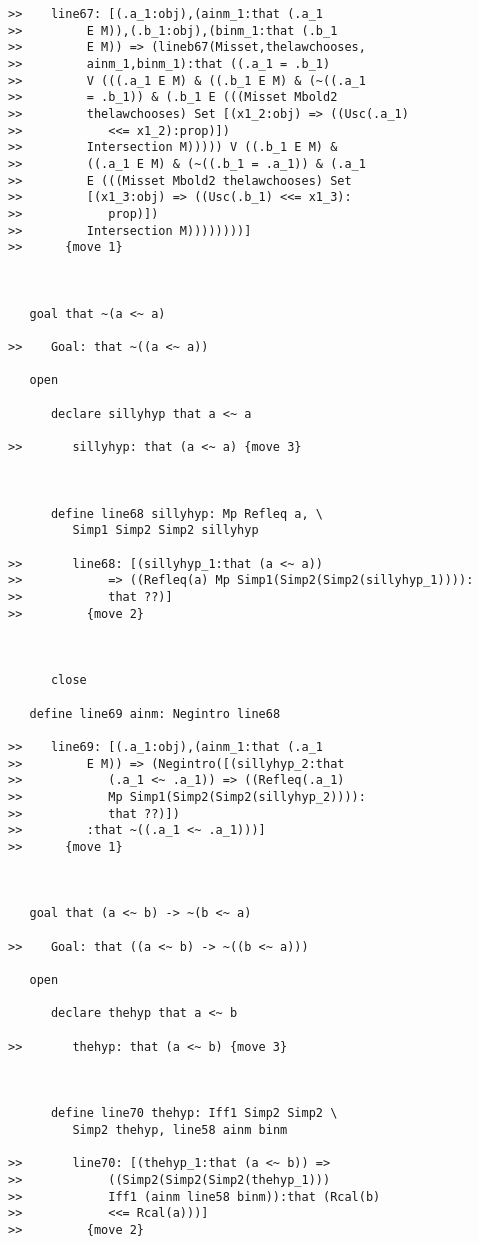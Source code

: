\documentclass[12pt]{article}
\begin{document}
\begin{verbatim}
>>    line67: [(.a_1:obj),(ainm_1:that (.a_1
>>         E M)),(.b_1:obj),(binm_1:that (.b_1
>>         E M)) => (lineb67(Misset,thelawchooses,
>>         ainm_1,binm_1):that ((.a_1 = .b_1)
>>         V (((.a_1 E M) & ((.b_1 E M) & (~((.a_1
>>         = .b_1)) & (.b_1 E (((Misset Mbold2
>>         thelawchooses) Set [(x1_2:obj) => ((Usc(.a_1)
>>            <<= x1_2):prop)])
>>         Intersection M))))) V ((.b_1 E M) &
>>         ((.a_1 E M) & (~((.b_1 = .a_1)) & (.a_1
>>         E (((Misset Mbold2 thelawchooses) Set
>>         [(x1_3:obj) => ((Usc(.b_1) <<= x1_3):
>>            prop)])
>>         Intersection M))))))))]
>>      {move 1}



   goal that ~(a <~ a)

>>    Goal: that ~((a <~ a))

   open

      declare sillyhyp that a <~ a

>>       sillyhyp: that (a <~ a) {move 3}



      define line68 sillyhyp: Mp Refleq a, \
         Simp1 Simp2 Simp2 sillyhyp

>>       line68: [(sillyhyp_1:that (a <~ a))
>>            => ((Refleq(a) Mp Simp1(Simp2(Simp2(sillyhyp_1)))):
>>            that ??)]
>>         {move 2}



      close

   define line69 ainm: Negintro line68

>>    line69: [(.a_1:obj),(ainm_1:that (.a_1
>>         E M)) => (Negintro([(sillyhyp_2:that
>>            (.a_1 <~ .a_1)) => ((Refleq(.a_1)
>>            Mp Simp1(Simp2(Simp2(sillyhyp_2)))):
>>            that ??)])
>>         :that ~((.a_1 <~ .a_1)))]
>>      {move 1}



   goal that (a <~ b) -> ~(b <~ a)

>>    Goal: that ((a <~ b) -> ~((b <~ a)))

   open

      declare thehyp that a <~ b

>>       thehyp: that (a <~ b) {move 3}



      define line70 thehyp: Iff1 Simp2 Simp2 \
         Simp2 thehyp, line58 ainm binm

>>       line70: [(thehyp_1:that (a <~ b)) =>
>>            ((Simp2(Simp2(Simp2(thehyp_1)))
>>            Iff1 (ainm line58 binm)):that (Rcal(b)
>>            <<= Rcal(a)))]
>>         {move 2}




\end{verbatim}
\end{document}
